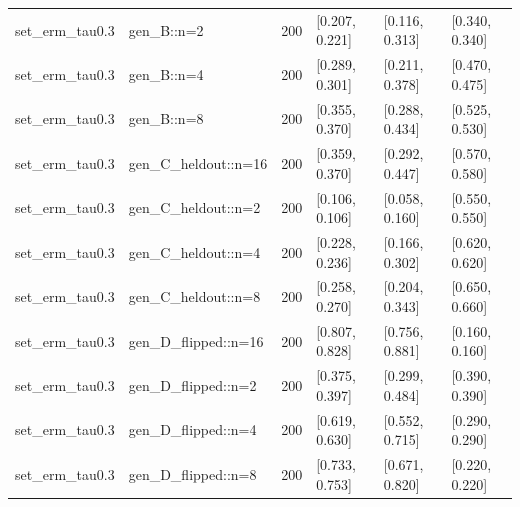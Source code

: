\begin{tabular}{llrlll}
set\_erm\_tau0.3 & gen\_B::n=2 & 200 & [0.207, 0.221] & [0.116, 0.313] & [0.340, 0.340] \\
set\_erm\_tau0.3 & gen\_B::n=4 & 200 & [0.289, 0.301] & [0.211, 0.378] & [0.470, 0.475] \\
set\_erm\_tau0.3 & gen\_B::n=8 & 200 & [0.355, 0.370] & [0.288, 0.434] & [0.525, 0.530] \\
set\_erm\_tau0.3 & gen\_C\_heldout::n=16 & 200 & [0.359, 0.370] & [0.292, 0.447] & [0.570, 0.580] \\
set\_erm\_tau0.3 & gen\_C\_heldout::n=2 & 200 & [0.106, 0.106] & [0.058, 0.160] & [0.550, 0.550] \\
set\_erm\_tau0.3 & gen\_C\_heldout::n=4 & 200 & [0.228, 0.236] & [0.166, 0.302] & [0.620, 0.620] \\
set\_erm\_tau0.3 & gen\_C\_heldout::n=8 & 200 & [0.258, 0.270] & [0.204, 0.343] & [0.650, 0.660] \\
set\_erm\_tau0.3 & gen\_D\_flipped::n=16 & 200 & [0.807, 0.828] & [0.756, 0.881] & [0.160, 0.160] \\
set\_erm\_tau0.3 & gen\_D\_flipped::n=2 & 200 & [0.375, 0.397] & [0.299, 0.484] & [0.390, 0.390] \\
set\_erm\_tau0.3 & gen\_D\_flipped::n=4 & 200 & [0.619, 0.630] & [0.552, 0.715] & [0.290, 0.290] \\
set\_erm\_tau0.3 & gen\_D\_flipped::n=8 & 200 & [0.733, 0.753] & [0.671, 0.820] & [0.220, 0.220] \\
\end{tabular}
